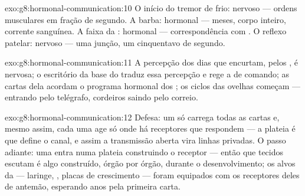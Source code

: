 \begin{solution}{exo:g8:hormonal-communication:10}
O início do tremor de frio: nervoso --- ordens musculares em fração de
segundo. A barba: hormonal --- meses, corpo inteiro, corrente
sanguínea. A faixa da : hormonal --- correspondência com
. O reflexo patelar: nervoso --- uma junção, um
cinquentavo de segundo.
\end{solution}

\begin{solution}{exo:g8:hormonal-communication:11}
A percepção dos dias que encurtam, pelos , é nervosa; o
escritório da base do  traduz essa percepção e rege a 
de comando; as cartas dela acordam o programa hormonal dos ; os
ciclos das ovelhas começam ---  entrando pelo telégrafo, cordeiros
saindo pelo correio.
\end{solution}

\begin{solution}{exo:g8:hormonal-communication:12}
Defesa: um  só carrega todas as cartas e, mesmo assim, cada uma
age só onde há receptores que respondem --- a plateia é que define o
canal, e assim a transmissão aberta vira linhas privadas. O passo
adiante: uma  entra numa plateia construindo o receptor --- então
que tecidos escutam é algo construído, órgão por órgão, durante o
desenvolvimento; os alvos da  --- laringe, , placas de
crescimento --- foram equipados com os receptores deles de antemão,
esperando anos pela primeira carta.
\end{solution}

